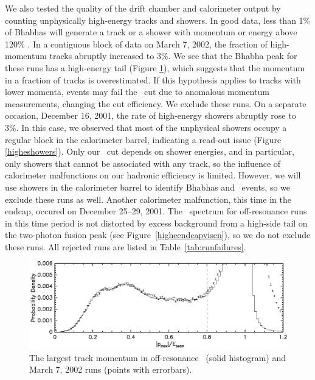 \documentclass{cornell}
\begin{document}
We also tested the quality of the drift chamber and calorimeter output
by counting unphysically high-energy tracks and showers.  In good
data, less than 1\% of Bhabhas will generate a track or a shower with
momentum or energy above 120\% \ebeam.  In a contiguous block of data
on March 7, 2002, the fraction of high-momentum tracks abruptly
increased to 3\%.  We see that the Bhabha peak for these runs has a
high-energy tail (Figure \ref{highptracks}), which suggests that the
momentum in a fraction of tracks is overestimated.  If this hypothesis
applies to tracks with lower momenta, events may fail the \pmax\ cut
due to anomalous momentum measurements, changing the cut efficiency.
We exclude these runs.  On a separate occasion, December 16, 2001, the
rate of high-energy showers abruptly rose to 3\%.  In this case, we
observed that most of the unphysical showers occupy a regular block in
the calorimeter barrel, indicating a read-out issue (Figure
\ref{higheshowers}).  Only our \visen\ cut depends on shower energies,
and in particular, only showers that cannot be associated with any
track, so the influence of calorimeter malfunctions on our hadronic
efficiency is limited.  However, we will use showers in the
calorimeter barrel to identify Bhabhas and \gamgam\ events, so we
exclude these runs as well.  Another calorimeter malfunction, this
time in the endcap, occured on December 25--29, 2001.  The \visen\
spectrum for off-resonance runs in this time period is not distorted
by excess background from a high-side tail on the two-photon fusion
peak (see Figure~\ref{higheendcapvisen}), so we do not exclude these
runs.  All rejected runs are listed in Table~\ref{tab:runfailures}.

\begin{figure}[p]
  \begin{center}
    \includegraphics[width=0.85\linewidth]{highptracks}
  \end{center}
  \caption[Distribution of largest track momenta on March 7,
  2002]{\label{highptracks} The largest track momentum in
  off-resonance \us\ (solid histogram) and March 7, 2002 runs (points
  with errorbars).}
\end{figure}
\end{document}
